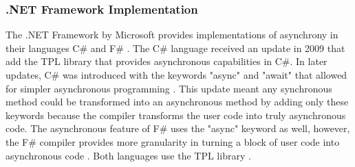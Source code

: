 \subsubsection{.NET Framework Implementation}

The .NET Framework by Microsoft provides implementations of asynchrony in their languages C\# and F\# \cite{syme2011f}\cite{Leijen2009}. The C\# language received an update in 2009 that add the TPL library that provides asynchronous capabilities in C\#. In later updates, C\# was introduced with the keywords "async" and "await" that allowed for simpler asynchronous programming \cite{alexdavies2012}. This update meant any synchronous method could be transformed into an asynchronous method by adding only these keywords because the compiler transforms the user code into truly asynchronous code. The asynchronous feature of F\# uses the "async" keyword as well, however, the F\# compiler provides more granularity in turning a block of user code into asynchronous code \cite{syme2011f}. Both languages use the TPL library \cite{Leijen2009}\cite{msftVFS}.
